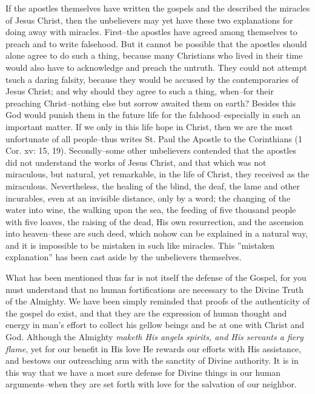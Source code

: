 If the apostles themselves have written the gospels and the described the miracles of Jesus Christ, then the unbelievers may yet have these two explanations for doing away with miracles. First--the apostles have agreed among themselves to preach and to write falsehood. But it cannot be possible that the apostles should alone agree to do such a thing, because many Christians who lived in their time would also have to acknowledge and preach the untruth. They could not attempt tsuch a daring falsity, because they would be accused by the contemporaries of Jesus Christ; and why should they agree to such a thing, when--for their preaching Christ--nothing else but sorrow awaited them on earth? Besides this God would punish them in the future life for the falshood--especially in such an important matter. If we only in this life hope in Christ, then we are the most unfortunate of all people--thus writes St. Paul the Apostle to the Corinthians (1 Cor. xv: 15, 19). Secondly--some other unbelievers contended that the apostles did not understand the works of Jesus Christ, and that which was not miraculous, but natural, yet remarkable, in the life of Christ, they received as the miraculous. Nevertheless, the healing of the blind, the deaf, the lame and other incurables, even at an invisible distance, only by a word; the changing of the water into wine, the walking upon the sea, the feeding of five thousand people with five loaves, the raising of the dead, His own resurrection, and the ascension into heaven--these are such deed, which nohow can be explained in a natural way, and it is impossible to be mistaken in such like miracles. This ''mistaken explanation'' has been cast aside by the unbelievers themselves.

What has been mentioned thus far is not itself the defense of the Gospel, for you must understand that no human fortifications are necessary to the Divine Truth of the Almighty. We have been simply reminded that proofs of the authenticity of the gospel do exist, and that they are the expression of human thought and energy in man's effort to collect his gellow beings and be at one with Christ and God. Although the Almighty \textit{maketh His angels spirits, and His servants a fiery flame}, yet for our benefit in His love He rewards our efforts with His assistance, and bestows our outreaching arm with the sanctity of Divine authority. It is in this way that we have a most sure defense for Divine things in our human arguments--when they are set forth with love for the salvation of our neighbor.

